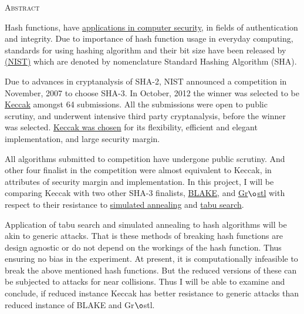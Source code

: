 \documentclass[12pt]{artikel3}                  %
\begin{document}
\begin{center}
\parbox{350pt}{
  \begin{center}\textsc{Abstract}\end{center}
  \vspace{0.5cm}
  Hash functions, have \href{"http://en.wikipedia.org/wiki/Cryptographic\_hash\_function\#Applications"}
  {applications in computer security}, in fields of authentication and integrity.
  Due to importance of hash function usage in everyday computing, standards for using hashing 
  algorithm and their bit size have been released by \href{"http://www.nist.gov/index.html"}
  {(NIST)} which are denoted by nomenclature Standard Hashing Algorithm (SHA).

  Due to advances in cryptanalysis of SHA-2, NIST announced a competition in November, 2007 
  to choose SHA-3. In October, 2012 the winner was selected to be \href{"http://keccak.noekeon.org/"}
  {Keccak} amongst 64 submissions. All the submissions were open to public scrutiny, and underwent
  intensive third party cryptanalysis, before the winner was selected. 
  \href{"http://csrc.nist.gov/groups/ST/hash/sha-3/sha-3\_selection\_announcement.pdf"}{Keccak was chosen}
   for its flexibility, efficient and elegant implementation, and large security margin.

  All algorithms submitted to competition have undergone public scrutiny. And other four finalist in 
  the competition were almost equivalent to Keccak, in attributes of security margin and implementation.
  In this project, I will be comparing Keccak with two other SHA-3 finalists, \href{"https://131002.net/blake/"}
  {BLAKE}, and \href{"http://www.groestl.info/"}{Gr$\o$stl} with respect to their resistance to 
  \href{"http://en.wikipedia.org/wiki/Simulated\_annealing"}{simulated annealing} and 
  \href{"http://en.wikipedia.org/wiki/Tabu\_search"}{tabu search}.
  
  Application of tabu search and simulated annealing to hash algorithms will be akin to generic attacks.
  That is these methods of breaking hash functions are design agnostic or do not depend on the workings
  of the hash function. Thus ensuring no bias in the experiment. At present, it is computationally infeasible
  to break the above mentioned hash functions. But the reduced versions of these can be subjected to attacks
  for near collisions. Thus I will be able to examine and conclude, if reduced instance Keccak has better 
  resistance to generic attacks than reduced instance of BLAKE and Gr$\o$stl.
}
\end{center}
\end{document}
